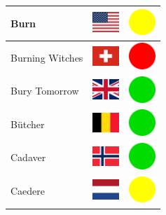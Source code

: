 \documentclass[12pt, a4paper, twoside]{report}
\begin{document}
\begin{center}
\begin{longtable}{|p{5cm}|p{2cm}|p{2cm}|}
 Burn                                                       & \includegraphics[width=1cm]{../img/flags/us} &   \includegraphics[width=1cm]{../likes/m} \\ \hline
 Burning Witches                                            & \includegraphics[width=1cm]{../img/flags/ch} &   \includegraphics[width=1cm]{../likes/n} \\ \hline
 Bury Tomorrow                                              & \includegraphics[width=1cm]{../img/flags/gb} &   \includegraphics[width=1cm]{../likes/y} \\ \hline
 Bütcher                                                    & \includegraphics[width=1cm]{../img/flags/be} &   \includegraphics[width=1cm]{../likes/y} \\ \hline
 Cadaver                                                    & \includegraphics[width=1cm]{../img/flags/no} &   \includegraphics[width=1cm]{../likes/y} \\ \hline
 Caedere                                                    & \includegraphics[width=1cm]{../img/flags/nl} &   \includegraphics[width=1cm]{../likes/m} \\ \hline

\end{longtable}
\end{center}
\end{document}
